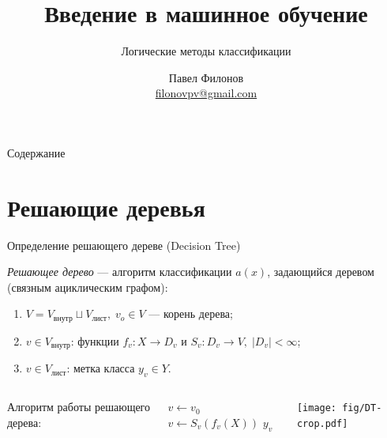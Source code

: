 \documentclass{beamer}
\author{Павел Филонов \\ \href{mailto:filonovpv@gmail.com}{filonovpv@gmail.com}}
\title{Введение в машинное обучение}
\subtitle{Логические методы классификации}
\begin{document}
\begin{frame}[plain]
    \titlepage
\end{frame}
\begin{frame}[plain]{Содержание}
  \tableofcontents
\end{frame}

\section{Решающие деревья}
\begin{frame}{Определение решающего дереве (Decision Tree)}

{\it Решающее дерево} --- алгоритм классификации $a(x)$, задающийся деревом (связным ациклическим графом):
\begin{enumerate}
    \item $V = V_{\text{внутр}} \sqcup V_{\text{лист}},\; v_o \in V$ --- корень дерева;
    \item $v \in V_{\text{внутр}}$: функции $f_v: X \rightarrow D_v$ и $S_v : D_v \rightarrow V,\; |D_v| < \infty$;
    \item $v \in V_{\text{лист}}$: метка класса $y_v \in Y$.
\end{enumerate}

\begin{columns}
Алгоритм работы решающего дерева:
\begin{algorithmic}
    \State $v \gets v_0$
        \State $v \gets S_v(f_v(X))$
    \EndWhile
    \State\Return $y_v$
\end{algorithmic}

\texttt{[image: fig/DT-crop.pdf]}
\end{columns}
\end{frame}
\end{document}
